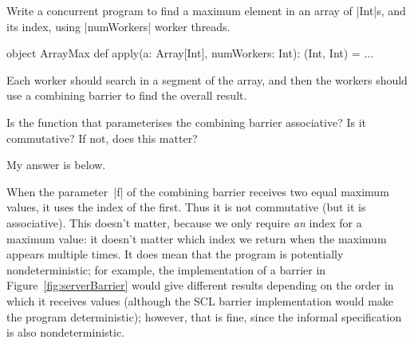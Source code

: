 \begin{questionS}
Write a concurrent program to find a maximum element in an array of |Int|s,
and its index, using |numWorkers| worker threads.  
%
\begin{scala}
object ArrayMax{
  def apply(a: Array[Int], numWorkers: Int): (Int, Int) = ... 
}
\end{scala}
%
Each worker should search in a segment of the array, and then the workers
should use a combining barrier to find the overall result.  

Is the function that parameterises the combining barrier associative?  Is it
commutative?  If not, does this matter?
\end{questionS}


\begin{answerS}
My answer is below.
%

When the parameter~|f| of the combining barrier receives two equal maximum
values, it uses the index of the first.  Thus it is not commutative (but it is
associative).  This doesn't matter, because we only require \emph{an} index
for a maximum value: it doesn't matter which index we return when the maximum
appears multiple times.  It does mean that the program is potentially
nondeterministic; for example, the implementation of a barrier in
Figure~\ref{fig:serverBarrier} would give different results depending on the
order in which it receives values (although the SCL barrier implementation
would make the program deterministic); however, that is fine, since the
informal specification is also nondeterministic.


\end{answerS}
